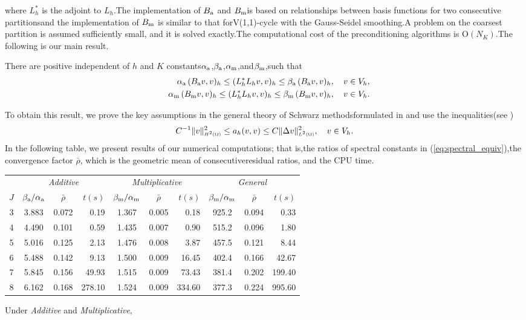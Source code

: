 \documentclass{report}
\begin{document}
where $L_h^*$ is the adjoint to $L_h$.The implementation of $B_{\textup{\scriptsize a}}$ and $B_{\textup{\scriptsize m}}$is based on relationships between basis functions for two consecutive partitionsand the implementation of $B_{\textup{\scriptsize m}}$ is similar to that forV(1,1)-cycle with the Gauss-Seidel smoothing.A problem on the coarsest partition is assumed sufficiently small,
and it is solved exactly.The computational cost of the preconditioning algorithms is $\mbox{O}(N_K)$.The following is our main result.\begin{theorem}There are positive independent of $h$ and $K$ constants$\alpha_{\textup{\scriptsize a}}$,$\beta_{\textup{\scriptsize a}}$,$\alpha_{\textup{\scriptsize m}}$,and$\beta_{\textup{\scriptsize m}}$,such that\begin{eqnarray}\label{eq:spectral_equiv}&&\alpha_{\textup{\scriptsize a}}\,
(B_{\textup{\scriptsize a}}v,v)_h\leq (L_h^*L_hv,v)_h \leq\beta_{\textup{\scriptsize a}}\,
(B_{\textup{\scriptsize a}}v,v)_h,\quad v\in V_h,\\\nonumber&&\alpha_{\textup{\scriptsize m}}\,
(B_{\textup{\scriptsize m}}v,v)_h\leq (L_h^*L_hv,v)_h \leq\beta_{\textup{\scriptsize m}}\,
(B_{\textup{\scriptsize m}}v,v)_h,\quad v\in V_h.\end{eqnarray}\end{theorem}To obtain this result,
we prove the key assumptions in the general theory of Schwarz methodsformulated in \cite{SBG_1996} and use the inequalities(see \cite{Bialecki_1998})\[C^{-1}\|v\|_{\mbox{$\scriptscriptstyle H^{2}(\Omega)$}}^2\leq a_h(v,v)\leq C\|\Delta v\|_{\mbox{$\scriptscriptstyle L^{2}(\Omega)$}}^2,\quad v\in V_h.\]In the following table,
we present results of our numerical computations;
that is,the ratios of spectral constants in (\ref{eq:spectral_equiv}),the convergence factor $\bar{\rho}$,
which is the geometric mean of consecutiveresidual ratios,
and the CPU time.\begin{center}\begin{tabular}{c|ccr|ccr|ccr}
& \multicolumn{3}{c|}{\textit{Additive}}
& \multicolumn{3}{c|}{\textit{Multiplicative}}&\multicolumn{3}{c}{\textit{General}}\\\cline{2-10}$J$
& $\beta_{\textrm{\scriptsize a}}/\alpha_{\textrm{\scriptsize a}}$
& $\bar{\rho}$
& $t(s)$
& $\beta_{\textrm{\scriptsize m}}/\alpha_{\textrm{\scriptsize m}}$
& $\bar{\rho}$
& $t(s)$
& $\beta_{\textrm{\scriptsize m}}/\alpha_{\textrm{\scriptsize m}}$
& $\bar{\rho}$
& $t(s)$\\\hline3
& 3.883
& 0.072
& 0.19
& 1.367
& 0.005
& 0.18
& 925.2
& 0.094
& 0.33\\4
& 4.490
& 0.101
& 0.59
& 1.435
& 0.007
& 0.90
& 515.2
& 0.096
& 1.80\\5
& 5.016
& 0.125
& 2.13
& 1.476
& 0.008
& 3.87
& 457.5
& 0.121
& 8.44\\6
& 5.488
& 0.142
& 9.13
& 1.500
& 0.009
& 16.45
& 402.4
& 0.166
& 42.67\\7
& 5.845
& 0.156
& 49.93
& 1.515
& 0.009
& 73.43
& 381.4
& 0.202
& 199.40\\8
& 6.162
& 0.168
& 278.10
& 1.524
& 0.009
& 334.60
& 377.3
& 0.224
& 995.60\end{tabular}\end{center}Under \textit{Additive} and \textit{Multiplicative},
\end{document}
